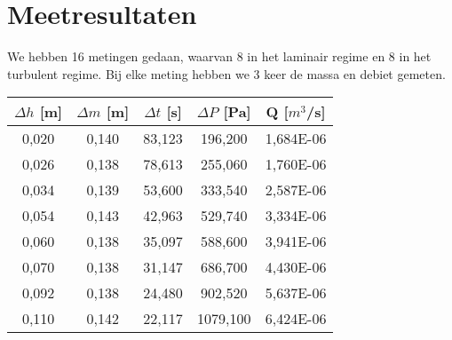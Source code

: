 \section{Meetresultaten}

We hebben 16 metingen gedaan, waarvan 8 in het laminair regime en 
8 in het turbulent regime. Bij elke meting hebben we 3 keer de massa en
debiet gemeten.
\begin{center}
    
    \begin{tabular}{| c | c | c | c | c |}
        \hline
        $\Delta h$ [m]  & $\Delta m$ [m]    & $\Delta t$ [s]    & $\Delta P$ [Pa]   & Q [$m^3$/s]      \\ \hline
        0,020           & 0,140             & 83,123            & 196,200           & 1,684E-06        \\ \hline
        0,026           & 0,138             & 78,613            & 255,060           & 1,760E-06         \\ \hline
        0,034           & 0,139             & 53,600            & 333,540           & 2,587E-06         \\ \hline
        0,054           & 0,143             & 42,963            & 529,740           & 3,334E-06         \\ \hline 
        0,060           & 0,138             & 35,097            & 588,600           & 3,941E-06         \\ \hline
        0,070           & 0,138             & 31,147            & 686,700           & 4,430E-06         \\ \hline
        0,092           & 0,138             & 24,480            & 902,520           & 5,637E-06         \\ \hline
        0,110           & 0,142             & 22,117            & 1079,100          & 6,424E-06         \\ \hline
    \end{tabular}
\end{center}
